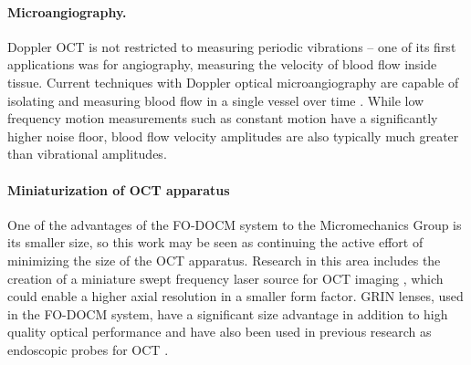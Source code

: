 \paragraph{Microangiography.} Doppler OCT is not restricted to measuring periodic vibrations -- one of its first applications was for angiography, measuring the velocity of blood flow inside tissue. Current techniques with Doppler optical microangiography are capable of isolating and measuring blood flow in a single vessel over time  \cite{Dziennis2012}. While low frequency motion measurements such as constant motion have a significantly higher noise floor, blood flow velocity amplitudes are also typically much greater than vibrational amplitudes.


\paragraph{Miniaturization of OCT apparatus} One of the advantages of the FO-DOCM system to the Micromechanics Group is its smaller size, so this work may be seen as continuing the active effort of minimizing the size of the OCT apparatus. Research in this area includes the creation of a miniature swept frequency laser source for OCT imaging \cite{Goldberg2009}, which could enable a higher axial resolution in a smaller form factor. GRIN lenses, used in the FO-DOCM system, have a significant size advantage in addition to high quality optical performance and have also been used in previous research as endoscopic probes for OCT \cite{Xie2006}.





% 





